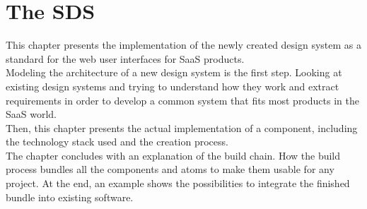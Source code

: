 \newpage
\section{The \acl{SDS}}
This chapter presents the implementation of the newly created design system as a standard for the web user interfaces for SaaS products. \\
Modeling the architecture of a new design system is the first step. Looking at existing design systems and trying to understand how they work and extract requirements in order to develop a common system that fits most products in the SaaS world. \\
Then, this chapter presents the actual implementation of a component, including the technology stack used and the creation process. \\
The chapter concludes with an explanation of the build chain. How the build process bundles all the components and atoms to make them usable for any project. At the end, an example shows the possibilities to integrate the finished bundle into existing software.



